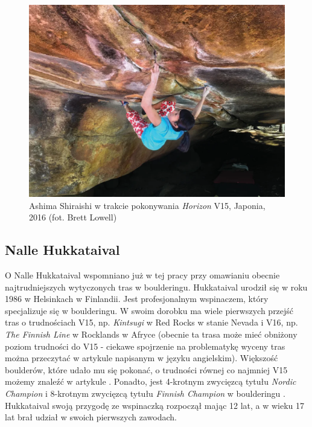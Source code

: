 \documentclass{article}
\begin{document}
\begin{figure}[!htbp]
	\begin{center}
		\includegraphics[width=0.6\linewidth]{images/ashima.eps}
	\end{center}
	\caption{Ashima Shiraishi w trakcie pokonywania \textit{Horizon} V15, Japonia, 2016 (fot. Brett Lowell) \cite{ashima-horizon}}
	\label{ashima-horizon}
\end{figure}

\subsection{Nalle Hukkataival}
\label{nh}
O Nalle Hukkataival wspomniano już w tej pracy przy omawianiu obecnie najtrudniejszych wytyczonych tras w boulderingu. Hukkataival urodził się w roku 1986 w Helsinkach w Finlandii. Jest profesjonalnym wspinaczem, który specjalizuje się w boulderingu. W swoim dorobku ma wiele pierwszych przejść tras o trudnościach V15, np. \textit{Kintsugi} w Red Rocks w stanie Nevada \cite{kintsugi} i V16, np. \textit{The Finnish Line} w Rocklands w Afryce \cite{finnish-line} (obecnie ta trasa może mieć obniżony poziom trudności do V15 - ciekawe spojrzenie na problematykę wyceny tras można przeczytać w artykule \cite{climb-hukka} napisanym w języku angielskim). Większość boulderów, które udało mu się pokonać, o trudności równej co najmniej V15 możemy znaleźć w artykule \cite{hardest}. Ponadto, jest 4-krotnym zwycięzcą tytułu \textit{Nordic Champion} i 8-krotnym zwycięzcą tytułu \textit{Finnish Champion} w boulderingu \cite{wiki-hukka}. Hukkataival swoją przygodę ze wspinaczką rozpoczął mając 12 lat, a w wieku 17 lat brał udział w swoich pierwszych zawodach.  
\end{document}

